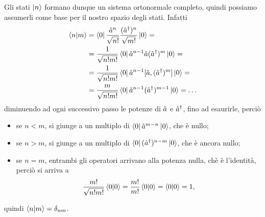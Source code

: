 Gli stati $\left|{n}\right\rangle$ formano dunque un sistema ortonormale completo, quindi possiamo assumerli come base per il nostro spazio degli stati.
Infatti
\begin{equation}
	\begin{split}
		\left\langle{n}\middle|{m}\right\rangle&=\left\langle{0}\right|\frac{\hat{a}^n}{\sqrt{n!}}\frac{({\hat{a}}^\dagger)^n}{\sqrt{m!}}\left|{0}\right\rangle=\\
		&=\frac1{\sqrt{n!m!}}\left\langle{0}\right|\hat{a}^{n-1}\hat{a}({\hat{a}}^\dagger)^m\left|{0}\right\rangle=\\
		&=\frac1{\sqrt{n!m!}}\left\langle{0}\right|\hat{a}^{n-1}[\hat{a},({\hat{a}}^\dagger)^m]\left|{0}\right\rangle=\\
		&=\frac{m}{\sqrt{n!m!}}\left\langle{0}\right|\hat{a}^{n-1}({\hat{a}}^\dagger)^{m-1}\left|{0}\right\rangle=\dots
	\end{split}
	\label{eq:oscillatore-armonico-ortonormalita-autostati}
\end{equation}
diminuendo ad ogni successivo passo le potenze di $\hat{a}$ e ${\hat{a}}^\dagger$, fino ad esaurirle, perciò
\begin{itemize}
	\item se $n<m$, si giunge a un multiplo di $\left\langle{0}\right|\hat{a}^{m-n}\left|{0}\right\rangle$, che è nullo;
	\item se $n>m$, si giunge a un multiplo di $\left\langle{0}\right|({\hat{a}}^\dagger)^{n-m}\left|{0}\right\rangle$, che è ancora nullo;
	\item se $n=m$, entrambi gli operatori arrivano alla potenza nulla, chè è l'identità, perciò si arriva a
		\begin{equation}
			\frac{m!}{\sqrt{n!m!}}\left\langle{0}\middle|{0}\right\rangle=\frac{m!}{m!}\left\langle{0}\middle|{0}\right\rangle=\left\langle{0}\middle|{0}\right\rangle=1,
		\end{equation}
\end{itemize}
quindi $\left\langle{n}\middle|{m}\right\rangle=\delta_{nm}$.


